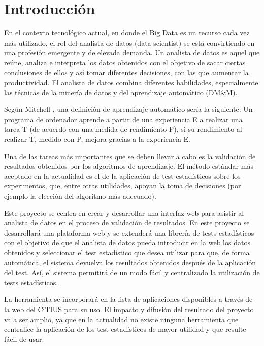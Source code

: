 
\chapter{Introducción}
En el contexto tecnológico actual, en donde el Big Data es un recurso cada vez más
utilizado, el rol del analista de datos (data scientist) se está convirtiendo en una profesión
emergente y de elevada demanda. Un analista de datos es aquel que reúne, analiza e interpreta
los datos obtenidos con el objetivo de sacar ciertas conclusiones de ellos y así tomar diferentes
decisiones, con las que aumentar la productividad. El analista de datos combina diferentes
habilidades, especialmente las técnicas de la minería de datos y del aprendizaje automático (DM\&M).

Según Mitchell \cite{mitchell}, una definición de aprendizaje automático sería la siguiente: Un programa de
ordenador aprende a partir de una experiencia E a realizar una tarea T (de acuerdo con una medida
de rendimiento P), si su rendimiento al realizar T, medido con P, mejora gracias a la experiencia E.

Una de las tareas más importantes que se deben llevar a cabo es la validación de resultados
obtenidos por los algoritmos de aprendizaje. El método estándar más aceptado en la actualidad
es el de la aplicación de test estadísticos sobre los experimentos, que, entre otras utilidades,
apoyan la toma de decisiones (por ejemplo la elección del algoritmo más adecuado).

Este proyecto se centra en crear y desarrollar una interfaz web para asistir al analista de
datos en el proceso de validación de resultados. En este proyecto se desarrollará una plataforma web
y se extenderá una librería de tests estadísticos con el objetivo de que el analista de datos
pueda introducir en la web los datos obtenidos y seleccionar el test estadístico que desea
utilizar para que, de forma automática, el sistema devuelva los resultados obtenidos después de
la aplicación del test. Así, el sistema permitirá de un modo fácil y centralizado la utilización de
tests estadísticos.

La herramienta se incorporará en la lista de aplicaciones disponibles a través de la web del
CiTIUS para su uso. El impacto y difusión del resultado del proyecto va a ser amplio, ya que en la
actualidad no existe ninguna herramienta que centralice la aplicación de los test estadísticos de mayor
utilidad y que resulte fácil de usar.

